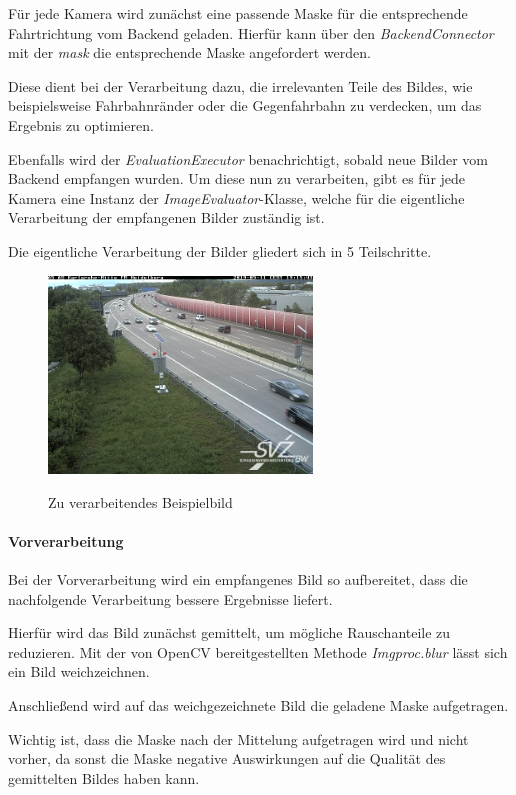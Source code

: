 Für jede Kamera wird zunächst eine passende Maske für die entsprechende Fahrtrichtung vom Backend geladen.
Hierfür kann über den {\em BackendConnector} mit der {\em mask} die entsprechende Maske angefordert werden.

Diese dient bei der Verarbeitung dazu, die irrelevanten Teile des Bildes, wie beispielsweise Fahrbahnränder oder die Gegenfahrbahn zu verdecken, um das Ergebnis zu optimieren.

Ebenfalls wird der {\em EvaluationExecutor} benachrichtigt, sobald neue Bilder vom Backend empfangen wurden.
Um diese nun zu verarbeiten, gibt es für jede Kamera eine Instanz der {\em ImageEvaluator}-Klasse, welche für die eigentliche Verarbeitung der empfangenen Bilder zuständig ist.

Die eigentliche Verarbeitung der Bilder gliedert sich in 5 Teilschritte.

\begin{figure}[ht]
   \centering
     \includegraphics[width=7cm]{Bilder/process/1} \\
 \caption{Zu verarbeitendes Beispielbild}
\end{figure}

\paragraph*{Vorverarbeitung}
Bei der Vorverarbeitung wird ein empfangenes Bild so aufbereitet, dass die nachfolgende Verarbeitung bessere Ergebnisse liefert.

Hierfür wird das Bild zunächst gemittelt, um mögliche Rauschanteile zu reduzieren.
Mit der von OpenCV bereitgestellten Methode {\em Imgproc.blur} lässt sich ein Bild weichzeichnen.

Anschließend wird auf das weichgezeichnete Bild die geladene Maske aufgetragen.

Wichtig ist, dass die Maske nach der Mittelung aufgetragen wird und nicht vorher, da sonst die Maske negative Auswirkungen auf die Qualität des gemittelten Bildes haben kann.

